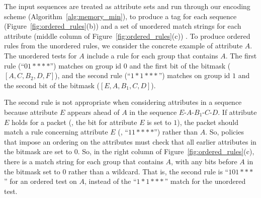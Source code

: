 The input sequences are treated as attribute {sets} and run through our encoding scheme (Algorithm~\ref{alg:memory_min}), to produce a tag for each sequence (Figure~\ref{fig:ordered_rules}(b)) and a set of unordered match strings for each attribute (middle column of Figure~\ref{fig:ordered_rules}(c)) .  To produce {ordered} rules from the unordered rules, we consider the concrete example of attribute $A$.  The unordered tests for $A$ include a rule for each group that contains $A$.  The first rule (``$01****$'') matches on group id $0$ and the first bit of the bitmask ($[A,C,B_2,D,F]$), and the second rule (``$1*1***$'') matches on group id $1$ and the second bit of the bitmask ($[E,A,B_1,C,D]$).

The second rule is not appropriate when considering
attributes in a {sequence} because attribute $E$ appears ahead of
$A$ in the sequence $E$-$A$-$B_1$-$C$-$D$.  If attribute $E$ holds for a
packet (\ie, the bit for attribute $E$ is set to $1$), the packet should
match a rule concerning attribute $E$ (\eg, ``$11****$'') rather than
$A$.  So, policies that impose an ordering on the attributes must check
that all {earlier} attributes in the bitmask are set to $0$.  So, in the
right column of Figure~\ref{fig:ordered_rules}(c), there is a match
string for each group that contains $A$, with any bits {before} $A$
in the bitmask set to $0$ rather than a wildcard.  That is, the second
rule is ``$101***$'' for an ordered test on $A$, instead of the
``$1*1***$'' match for the unordered test. 
